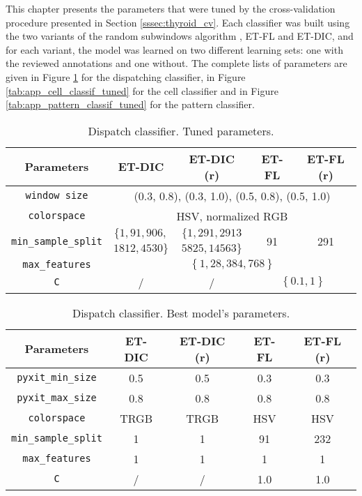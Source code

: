 \label{app:cross_val}

This chapter presents the parameters that were tuned by the cross-validation procedure presented in Section \ref{sssec:thyroid_cv}. Each classifier was built using the two variants of the random subwindows algorithm , ET-FL and ET-DIC, and for each variant, the model was learned on two different learning sets: one with the reviewed annotations and one without. The complete lists of parameters are given in Figure \ref{tab:app_disp_classif_tuned} for the dispatching classifier, in Figure \ref{tab:app_cell_classif_tuned} for the cell classifier and in Figure \ref{tab:app_pattern_classif_tuned} for the pattern classifier.

\begin{table}
	\center 
	\begin{tabular}{|c|cccc|}
		\hline
		Parameters & ET-DIC & ET-DIC (r) & ET-FL & ET-FL (r) \\
		\hline		
		\texttt{window size} & \multicolumn{4}{|c|}{(0.3, 0.8), (0.3, 1.0), (0.5, 0.8), (0.5, 1.0)} \\
		\texttt{colorspace} & \multicolumn{4}{|c|}{HSV, normalized RGB} \\
		\multirow{2}{*}{\texttt{min\_sample\_split}} & $\{1, 91, 906,$ &  $\{1, 291, 2913$ & \multirow{2}{*}{91} & \multirow{2}{*}{291}\\
		& $1812, 4530\}$ & $5825, 14563 \}$ & & \\
		\texttt{max\_features} & \multicolumn{4}{|c|}{$\left\{1, 28, 384, 768\right\}$}\\ 
		\texttt{C} & / & / & \multicolumn{2}{c|}{$\left\{0.1, 1\right\}$}\\
		\hline
	\end{tabular}
	\caption{Dispatch classifier. Tuned parameters.}
	\label{tab:app_disp_classif_tuned}
\end{table}

\begin{table}
	\small
	\center 
	\begin{tabular}{|c|c|c|c|c|}
		\hline
		Parameters & ET-DIC & ET-DIC (r) & ET-FL & ET-FL (r) \\
		\hline		
		\texttt{pyxit\_min\_size} & 0.5 & 0.5 & 0.3 & 0.3 \\
		\texttt{pyxit\_max\_size} & 0.8 & 0.8 & 0.8 & 0.8 \\
		\texttt{colorspace} & TRGB & TRGB & HSV & HSV \\
		\texttt{min\_sample\_split} & 1 & 1 & 91 & 232\\
		\texttt{max\_features} & 1 & 1 & 1 & 1\\ 
		\texttt{C} & / & / & 1.0 & 1.0\\
		\hline
	\end{tabular}
	\caption{Dispatch classifier. Best model's parameters.}
	\label{tab:dispatch_classif_best_params}
\end{table}


